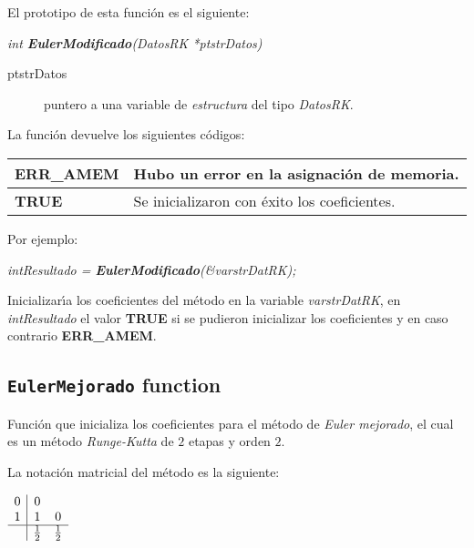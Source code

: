 El prototipo de esta funci\'on es el siguiente:

\begin{center}
\emph{int \textbf{EulerModificado}(DatosRK *ptstrDatos)}
\end{center}

\begin{description}
\item[ptstrDatos] puntero a una variable de \emph{estructura} del tipo
\emph{DatosRK}.
\end{description}

La funci\'on devuelve los siguientes c\'odigos:

\begin{center}
\begin{tabular}{|l|l|}
\hline
\textbf{ERR\_AMEM} & Hubo un error en la asignaci\'on de memoria. \\
\hline
\textbf{TRUE} & Se inicializaron con \'exito los coeficientes. \\
\hline
\end{tabular}
\end{center}

Por ejemplo:

\begin{center}
\emph{intResultado = \textbf{EulerModificado}(\&varstrDatRK);}
\end{center}


Inicializar\'{\i}a los coeficientes del m\'etodo en la variable
\emph{varstrDatRK}, en \emph{intResultado} el valor \textbf{TRUE} si se pudieron
inicializar los coeficientes y en caso contrario \textbf{ERR\_AMEM}.

\subsection{\texttt{EulerMejorado} function}

Funci\'on que inicializa los coeficientes para el m\'etodo de \emph{Euler mejorado},
el cual es un m\'etodo \emph{Runge-Kutta} de $2$ etapas y orden $2$.\newline

La notaci\'on matricial del m\'etodo es la siguiente:

\begin{center}
$
\begin{array}{c|cc}
0 & 0 \\
1 & 1 & 0 \\
\hline
 & \frac{1}{2} & \frac{1}{2}
\end{array}
$
\end{center}

